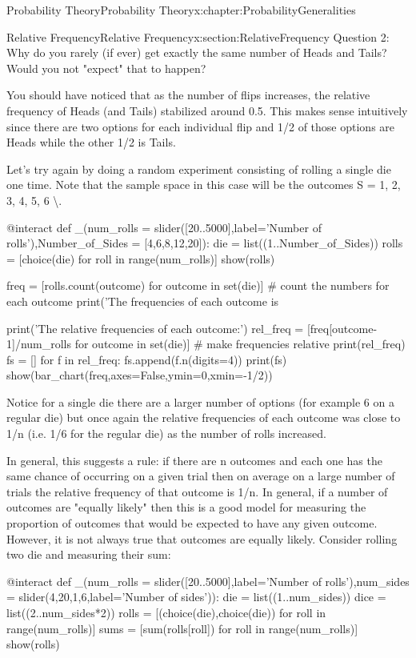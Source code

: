 \documentclass[oneside,10pt,]{book}
\numberwithin{equation}{section}
\begin{document}
\begin{chapterptx}{Probability Theory}{}{Probability Theory}{}{}{x:chapter:ProbabilityGeneralities}
\begin{sectionptx}{Relative Frequency}{}{Relative Frequency}{}{}{x:section:RelativeFrequency}
Question 2: Why do you rarely (if ever) get exactly the same number of Heads and Tails? Would you not "expect" that to happen?%
\par
You should have noticed that as the number of flips increases, the relative frequency of Heads (and Tails) stabilized around 0.5. This makes sense intuitively since there are two options for each individual flip and 1\slash{}2 of those options are Heads while the other 1\slash{}2 is Tails.%
\par
Let's try again by doing a random experiment consisting of rolling a single die one time. Note that the sample space in this case will be the outcomes S = \textbraceleft{} 1, 2, 3, 4, 5, 6 \textbackslash{}.%
\begin{sageinput}
@interact
def _(num_rolls = slider([20..5000],label='Number of rolls'),Number_of_Sides = [4,6,8,12,20]):
	die = list((1..Number_of_Sides))
	rolls = [choice(die) for roll in range(num_rolls)]
	show(rolls)   

	freq = [rolls.count(outcome) for outcome in set(die)]  # count the numbers for each outcome
	print('The frequencies of each outcome is %

	print('The relative frequencies of each outcome:')
	rel_freq = [freq[outcome-1]/num_rolls for outcome in set(die)]  # make frequencies relative
	print(rel_freq)
	fs = []
	for f in rel_freq:
		fs.append(f.n(digits=4))
	print(fs)
	show(bar_chart(freq,axes=False,ymin=0,xmin=-1/2))
\end{sageinput}
Notice for a single die there are a larger number of options (for example 6 on a regular die) but once again the relative frequencies of each  outcome was close to 1\slash{}n (i.e. 1\slash{}6 for the regular die) as the number of rolls increased.%
\par
In general, this suggests a rule: if there are n outcomes and each one has the same chance of occurring on a given trial then on average on a large number of trials the relative frequency of that outcome is 1\slash{}n. In general, if a number of outcomes are "equally likely" then this is a good model for measuring the proportion of outcomes that would be expected to have any given outcome. However, it is not always true that outcomes are equally likely. Consider rolling two die and measuring their sum:%
\begin{sageinput}
@interact
def _(num_rolls = slider([20..5000],label='Number of rolls'),num_sides = slider(4,20,1,6,label='Number of sides')):
    die = list((1..num_sides))
    dice = list((2..num_sides*2))
    rolls = [(choice(die),choice(die)) for roll in range(num_rolls)]
    sums = [sum(rolls[roll]) for roll in range(num_rolls)]
    show(rolls)   


\end{sageinput}
\end{sectionptx}
\end{chapterptx}
\end{document}
